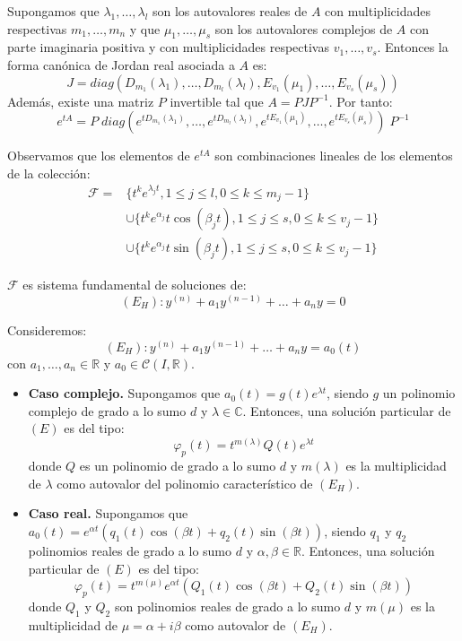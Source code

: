 Supongamos que $\lambda_1, \dots, \lambda_l$ son los autovalores reales de $A$ con multiplicidades respectivas $m_1, \dots, m_n$ y que $\mu_1, \dots, \mu_s$ son los autovalores complejos de $A$ con parte imaginaria positiva y con multiplicidades respectivas $v_1, \dots, v_s$.
Entonces la forma canónica de Jordan real asociada a $A$ es:
$$J = diag(D_{m_1}(\lambda_1), \dots, D_{m_l}(\lambda_l), E_{v_1}(\mu_1), \dots, E_{v_s}(\mu_s))$$
Además, existe una matriz $P$ invertible tal que $A = PJP^{-1}$.
Por tanto:
$$e^{tA} = P \; diag(e^{tD_{m_1}(\lambda_1)}, \dots, e^{tD_{m_l}(\lambda_l)}, e^{tE_{v_1}(\mu_1)}, \dots, e^{tE_{v_s}(\mu_s)}) \; P^{-1}$$

Observamos que los elementos de $e^{tA}$ son combinaciones lineales de los elementos de la colección:
\begin{align*}
    \mathcal{F} = & \{t^ke^{\lambda_jt}, 1 \leq j \leq l, 0 \leq k \leq m_j-1\}                   \\
                  & \cup \{t^ke^{\alpha_j}t\cos(\beta_jt), 1 \leq j \leq s, 0 \leq k \leq v_j-1\} \\
                  & \cup \{t^ke^{\alpha_j}t\sin(\beta_jt), 1 \leq j \leq s, 0 \leq k \leq v_j-1\}
\end{align*}

\begin{theorem}
    $\mathcal{F}$ es sistema fundamental de soluciones de:
    $$(E_H): y^{(n)} + a_1y^{(n-1)} + \dots + a_ny = 0$$
\end{theorem}

\begin{theorem}
    Consideremos:
    $$(E_H): y^{(n)} + a_1y^{(n-1)} + \dots + a_ny = a_0(t)$$
    con $a_1, \dots,a_n \in \mathbb{R}$ y $a_0 \in \mathcal{C}(I, \mathbb{R})$.
    \begin{itemize}
        \item \textbf{Caso complejo.}
              Supongamos que $a_0(t) = g(t)e^{\lambda t}$, siendo $g$ un polinomio complejo de grado a lo sumo $d$ y $\lambda \in \mathbb{C}$.
              Entonces, una solución particular de $(E)$ es del tipo:
              $$\varphi_p(t) = t^{m(\lambda)}Q(t)e^{\lambda t}$$
              donde $Q$ es un polinomio de grado a lo sumo $d$ y $m(\lambda)$ es la multiplicidad de $\lambda$ como autovalor del polinomio característico de $(E_H)$.
        \item \textbf{Caso real.}
              Supongamos que $a_0(t) = e^{\alpha t}(q_1(t)\cos(\beta t) + q_2(t)\sin(\beta t))$, siendo $q_1$ y $q_2$ polinomios reales de grado a lo sumo $d$ y $\alpha, \beta \in \mathbb{R}$.
              Entonces, una solución particular de $(E)$ es del tipo:
              $$\varphi_p(t) = t^{m(\mu)}e^{\alpha t}(Q_1(t)\cos(\beta t) + Q_2(t)\sin(\beta t))$$
              donde $Q_1$ y $Q_2$ son polinomios reales de grado a lo sumo $d$ y $m(\mu)$ es la multiplicidad de $\mu = \alpha + i\beta$ como autovalor de $(E_H)$.
    \end{itemize}
\end{theorem}